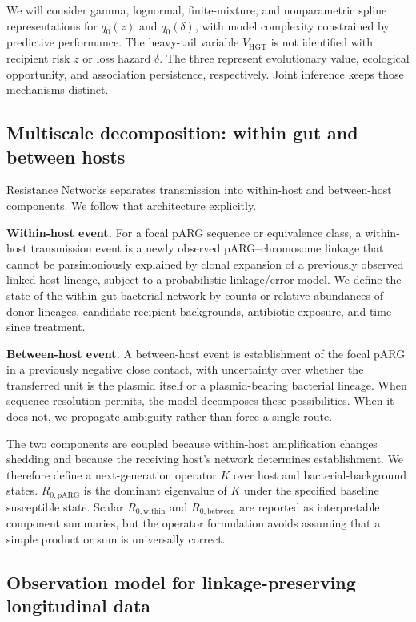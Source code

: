 \documentclass[12pt,a4paper]{article}
\newcommand{\Rwithin}{R_{0,\mathrm{within}}}
\newcommand{\Rbetween}{R_{0,\mathrm{between}}}
\newcommand{\RpARG}{R_{0,\mathrm{pARG}}}
\newcommand{\VHGT}{V_{\mathrm{HGT}}}
\begin{document}
We will consider gamma, lognormal, finite-mixture, and nonparametric spline representations for $q_0(z)$ and $q_0(\delta)$, with model complexity constrained by predictive performance. The heavy-tail variable $\VHGT$ is not identified with recipient risk $z$ or loss hazard $\delta$. The three represent evolutionary value, ecological opportunity, and association persistence, respectively. Joint inference keeps those mechanisms distinct.

\subsection{Multiscale decomposition: within gut and between hosts}

Resistance Networks separates transmission into within-host and between-host components. We follow that architecture explicitly.

\textbf{Within-host event.} For a focal pARG sequence or equivalence class, a within-host transmission event is a newly observed pARG--chromosome linkage that cannot be parsimoniously explained by clonal expansion of a previously observed linked host lineage, subject to a probabilistic linkage/error model. We define the state of the within-gut bacterial network by counts or relative abundances of donor lineages, candidate recipient backgrounds, antibiotic exposure, and time since treatment.

\textbf{Between-host event.} A between-host event is establishment of the focal pARG in a previously negative close contact, with uncertainty over whether the transferred unit is the plasmid itself or a plasmid-bearing bacterial lineage. When sequence resolution permits, the model decomposes these possibilities. When it does not, we propagate ambiguity rather than force a single route.

The two components are coupled because within-host amplification changes shedding and because the receiving host's network determines establishment. We therefore define a next-generation operator $K$ over host and bacterial-background states. $\RpARG$ is the dominant eigenvalue of $K$ under the specified baseline susceptible state. Scalar $\Rwithin$ and $\Rbetween$ are reported as interpretable component summaries, but the operator formulation avoids assuming that a simple product or sum is universally correct.

\subsection{Observation model for linkage-preserving longitudinal data}\label{sec:obsmodel}
\end{document}
